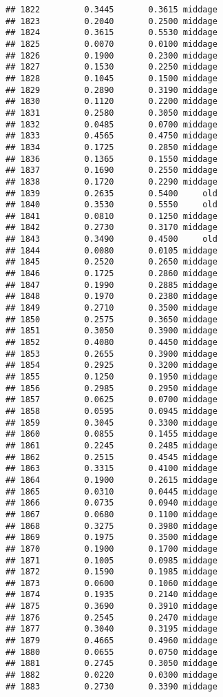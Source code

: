 \documentclass[
]{article}
\begin{document}
\begin{verbatim}
## 1822         0.3445       0.3615 middage
## 1823         0.2040       0.2500 middage
## 1824         0.3615       0.5530 middage
## 1825         0.0070       0.0100 middage
## 1826         0.1900       0.2300 middage
## 1827         0.1530       0.2250 middage
## 1828         0.1045       0.1500 middage
## 1829         0.2890       0.3190 middage
## 1830         0.1120       0.2200 middage
## 1831         0.2580       0.3050 middage
## 1832         0.0485       0.0700 middage
## 1833         0.4565       0.4750 middage
## 1834         0.1725       0.2850 middage
## 1836         0.1365       0.1550 middage
## 1837         0.1690       0.2550 middage
## 1838         0.1720       0.2290 middage
## 1839         0.2635       0.5400     old
## 1840         0.3530       0.5550     old
## 1841         0.0810       0.1250 middage
## 1842         0.2730       0.3170 middage
## 1843         0.3490       0.4500     old
## 1844         0.0080       0.0105 middage
## 1845         0.2520       0.2650 middage
## 1846         0.1725       0.2860 middage
## 1847         0.1990       0.2885 middage
## 1848         0.1970       0.2380 middage
## 1849         0.2710       0.3500 middage
## 1850         0.2575       0.3650 middage
## 1851         0.3050       0.3900 middage
## 1852         0.4080       0.4450 middage
## 1853         0.2655       0.3900 middage
## 1854         0.2925       0.3200 middage
## 1855         0.1250       0.1950 middage
## 1856         0.2985       0.2950 middage
## 1857         0.0625       0.0700 middage
## 1858         0.0595       0.0945 middage
## 1859         0.3045       0.3300 middage
## 1860         0.0855       0.1455 middage
## 1861         0.2245       0.2485 middage
## 1862         0.2515       0.4545 middage
## 1863         0.3315       0.4100 middage
## 1864         0.1900       0.2615 middage
## 1865         0.0310       0.0445 middage
## 1866         0.0735       0.0940 middage
## 1867         0.0680       0.1100 middage
## 1868         0.3275       0.3980 middage
## 1869         0.1975       0.3500 middage
## 1870         0.1900       0.1700 middage
## 1871         0.1005       0.0985 middage
## 1872         0.1590       0.1985 middage
## 1873         0.0600       0.1060 middage
## 1874         0.1935       0.2140 middage
## 1875         0.3690       0.3910 middage
## 1876         0.2545       0.2470 middage
## 1877         0.3040       0.3195 middage
## 1879         0.4665       0.4960 middage
## 1880         0.0655       0.0750 middage
## 1881         0.2745       0.3050 middage
## 1882         0.0220       0.0300 middage
## 1883         0.2730       0.3390 middage

\end{verbatim}
\end{document}
